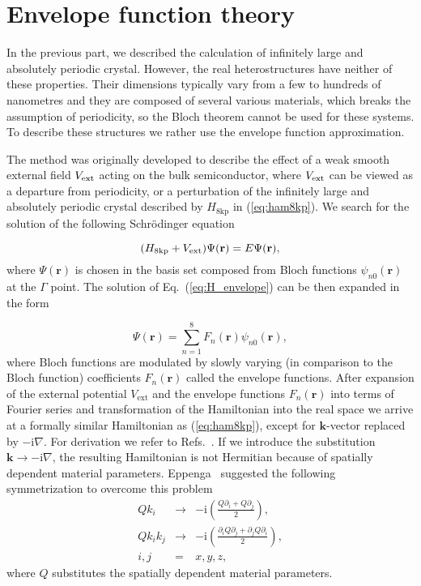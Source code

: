 

\section{Envelope function theory}
\label{secTheorEnvelope}

In the previous part, we described the calculation of infinitely large and absolutely periodic crystal. However, the real heterostructures have neither of these properties. Their dimensions typically vary from a few to hundreds of nanometres and they are composed of several various materials, which breaks the assumption of periodicity, so the Bloch theorem cannot be used for these systems. To describe these structures we rather use the envelope function approximation.

The method was originally developed to describe the effect of a weak smooth external field $V_{\rm ext}$ acting on the bulk semiconductor, where $V_{\rm ext}$ can be viewed as a departure from periodicity, or a perturbation of the infinitely large and absolutely periodic crystal described by  $H_\mathrm{8kp}$ in (\ref{eq:ham8kp}). We search for the solution of the following Schr\"{o}dinger equation

\begin{equation}
(H_\mathrm{8kp}+V_{\rm ext})\Psi(\mathbf{r})=E\Psi(\mathbf{r}), \label{eq:H_envelope}
\end{equation}
where $\Psi(\mathbf{r})$ is chosen in the basis set composed from Bloch functions $\psi_{n0}(\mathbf{r})$ at the $\Gamma$ point. The solution of Eq.~(\ref{eq:H_envelope}) can be then expanded in the form
 
 \begin{equation}
 \label{eqEnvelope}
 \Psi(\mathbf{r})=\sum_{n=1}^8 F_n(\mathbf{r})\psi_{n0}(\mathbf{r}),
 \end{equation}
where Bloch functions are modulated by slowly varying (in comparison to the Bloch function) coefficients $F_n(\mathbf{r})$ called the envelope functions. After expansion of the external potential $V_\mathrm{ext}$ and the envelope functions $F_n(\mathbf{r})$ into terms of Fourier series and transformation of the Hamiltonian into the real space we arrive at a formally similar Hamiltonian as (\ref{eq:ham8kp}), except for $\mathbf{k}$-vector replaced by $-\mathrm{i}\nabla$. For derivation we refer to Refs.~\citep{Bastard1,Bastard2}. If we introduce the substitution $\mathbf{k}\rightarrow -\mathrm{i}\nabla$, the resulting Hamiltonian is not Hermitian because of spatially dependent material parameters. Eppenga~\citep{Eppenga} suggested the following symmetrization to overcome this problem
\begin{eqnarray}
Qk_i&\rightarrow&-\mathrm{i}\left(\frac{Q\partial_i+Q\partial_j}{2}\right),\nonumber\\
Qk_ik_j&\rightarrow&-\mathrm{i}\left(\frac{\partial_iQ\partial_j+\partial_jQ\partial_i}{2}\right),\nonumber\\
i,j&=&x,y,z,\nonumber
\end{eqnarray}
where $Q$ substitutes the spatially dependent material parameters. 

